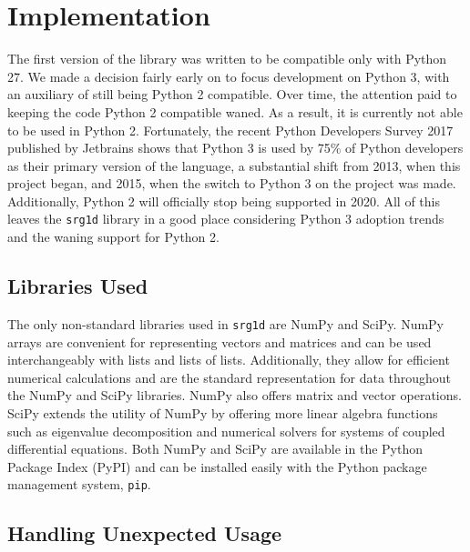 \section{Implementation}

The first version of the library was written to be compatible only with Python 2\.7. We made a decision fairly early on to focus development on Python 3, with an auxiliary of still being Python 2 compatible. Over time, the attention paid to keeping the code Python 2 compatible waned. As a result, it is currently not able to be used in Python 2. Fortunately, the recent Python Developers Survey 2017 published by Jetbrains shows that Python 3 is used by 75\% of Python developers as their primary version of the language, a substantial shift from 2013, when this project began, and 2015, when the switch to Python 3 on the project was made. Additionally, Python 2 will officially stop being supported in 2020. All of this leaves the \texttt{srg1d} library in a good place considering Python 3 adoption trends and the waning support for Python 2.

\subsection{Libraries Used}

The only non-standard libraries used in \texttt{srg1d} are NumPy and SciPy. NumPy arrays are convenient for representing vectors and matrices and can be used interchangeably with lists and lists of lists. Additionally, they allow for efficient numerical calculations and are the standard representation for data throughout the NumPy and SciPy libraries. NumPy also offers matrix and vector operations. SciPy extends the utility of NumPy by offering more linear algebra functions such as eigenvalue decomposition and numerical solvers for systems of coupled differential equations. Both NumPy and SciPy are available in the Python Package Index (PyPI) and can be installed easily with the Python package management system, \texttt{pip}.

\subsection{Handling Unexpected Usage}

